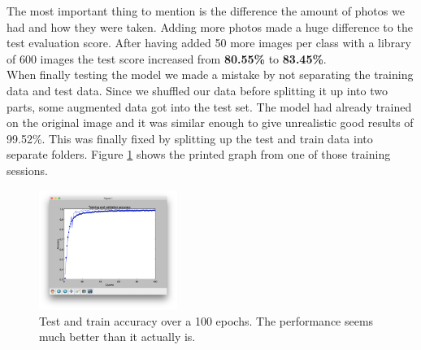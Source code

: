 The most important thing to mention is the difference the amount of photos we had and how they
were taken. Adding more photos made a huge difference to the test evaluation score.
After having added 50 more images per class with a library of 600 images the test score increased
from \textbf{80.55\%} to \textbf{83.45\%}. \\

When finally testing the model we made a mistake by not separating the training data and test data.
Since we shuffled our data before splitting it up into two parts, some augmented data got into the
test set. The model had already trained on the original image and it was similar enough to
give unrealistic good results of 99.52\%. This was finally fixed by splitting up the test and train data 
into separate folders. Figure \ref{fig:augmentedtestdata} shows the printed graph from one of those
training sessions.

\begin{figure}[!hbtp]
\begin{center}
\includegraphics[width = 0.4\textwidth]{./Images/augmentedtestdata}
\caption{Test and train accuracy over a 100 epochs. The performance seems much better than it actually is.}
\label{fig:augmentedtestdata}
\end{center}
\end{figure}

